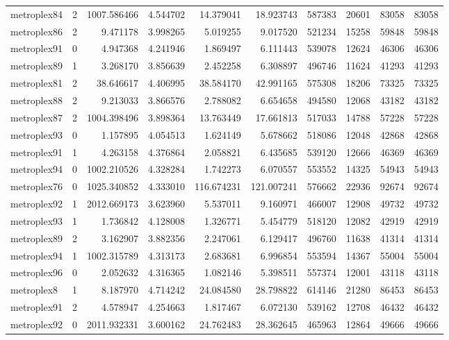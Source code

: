 \begin{longtable}{|l|r|r|r|r|r|r|r|r|r|}
metroplex84 & 2 & 1007.586466 & 4.544702 & 14.379041 & 18.923743 & 587383 & 20601 & 83058 & 83058 \\
metroplex86 & 2 & 9.471178 & 3.998265 & 5.019255 & 9.017520 & 521234 & 15258 & 59848 & 59848 \\
metroplex91 & 0 & 4.947368 & 4.241946 & 1.869497 & 6.111443 & 539078 & 12624 & 46306 & 46306 \\
metroplex89 & 1 & 3.268170 & 3.856639 & 2.452258 & 6.308897 & 496746 & 11624 & 41293 & 41293 \\
metroplex81 & 2 & 38.646617 & 4.406995 & 38.584170 & 42.991165 & 575308 & 18206 & 73325 & 73325 \\
metroplex88 & 2 & 9.213033 & 3.866576 & 2.788082 & 6.654658 & 494580 & 12068 & 43182 & 43182 \\
metroplex87 & 2 & 1004.398496 & 3.898364 & 13.763449 & 17.661813 & 517033 & 14788 & 57228 & 57228 \\
metroplex93 & 0 & 1.157895 & 4.054513 & 1.624149 & 5.678662 & 518086 & 12048 & 42868 & 42868 \\
metroplex91 & 1 & 4.263158 & 4.376864 & 2.058821 & 6.435685 & 539120 & 12666 & 46369 & 46369 \\
metroplex94 & 0 & 1002.210526 & 4.328284 & 1.742273 & 6.070557 & 553552 & 14325 & 54943 & 54943 \\
metroplex76 & 0 & 1025.340852 & 4.333010 & 116.674231 & 121.007241 & 576662 & 22936 & 92674 & 92674 \\
metroplex92 & 1 & 2012.669173 & 3.623960 & 5.537011 & 9.160971 & 466007 & 12908 & 49732 & 49732 \\
metroplex93 & 1 & 1.736842 & 4.128008 & 1.326771 & 5.454779 & 518120 & 12082 & 42919 & 42919 \\
metroplex89 & 2 & 3.162907 & 3.882356 & 2.247061 & 6.129417 & 496760 & 11638 & 41314 & 41314 \\
metroplex94 & 1 & 1002.315789 & 4.313173 & 2.683681 & 6.996854 & 553594 & 14367 & 55004 & 55004 \\
metroplex96 & 0 & 2.052632 & 4.316365 & 1.082146 & 5.398511 & 557374 & 12001 & 43118 & 43118 \\
metroplex8 & 1 & 8.187970 & 4.714242 & 24.084580 & 28.798822 & 614146 & 21280 & 86453 & 86453 \\
metroplex91 & 2 & 4.578947 & 4.254663 & 1.817467 & 6.072130 & 539162 & 12708 & 46432 & 46432 \\
metroplex92 & 0 & 2011.932331 & 3.600162 & 24.762483 & 28.362645 & 465963 & 12864 & 49666 & 49666 \\

\end{longtable}
